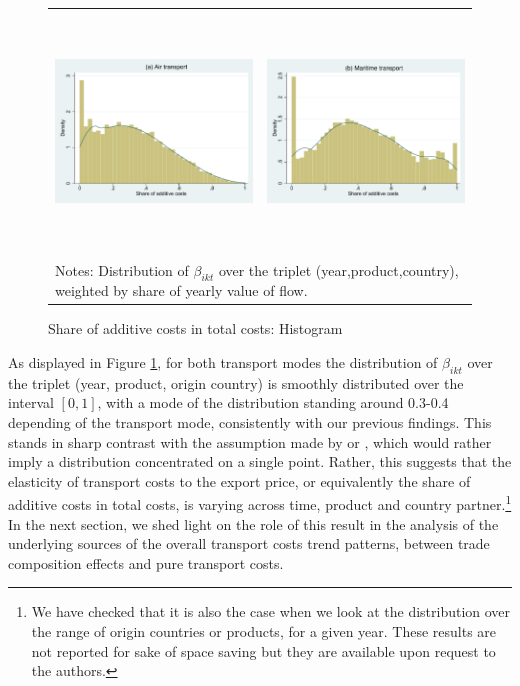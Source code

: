\documentclass[a4paper,11pt]{article}
\begin{document}
\begin{figure}[htbp]
\caption{Share of additive costs in total costs: Histogram}
\label{fig:histogram_beta}
\begin{center}
\begin{tabular}{cc}
\includegraphics[width=3.0in, height=2.5in]{Etude_beta_pondere_air.pdf}
& \includegraphics[width=3.0in,height=2.5in]{Etude_beta_pondere_ves.pdf} \\
\multicolumn{2}{l}{{\footnotesize Notes: Distribution of $\beta_{ikt}$ over the triplet (year,product,country), weighted by share of yearly value of flow.}}\\
\end{tabular}
\end{center}
\end{figure}

As displayed in Figure \ref{fig:histogram_beta}, for both transport modes the distribution of $\beta_{ikt}$ over the triplet (year, product, origin country) is smoothly distributed over the interval $[0,1]$, with a mode of the distribution standing around 0.3-0.4 depending of the transport mode, consistently with our previous findings.
This stands in sharp contrast with the assumption made by  \cite{hummels_skiba} or \cite{hummels2007}, which would rather imply a distribution concentrated on a single point.
Rather, this suggests that the elasticity of transport costs to the export price, or equivalently the share of additive costs in total costs, is varying across time, product and country partner.\footnote{We have checked that it is also the case when we look at the distribution over the range of origin countries or products, for a given year.
These results are not reported for sake of space saving but they are available upon request to the authors.} In the next section, we shed light on the role of this result in the analysis of the underlying sources of the overall transport costs trend patterns, between trade composition effects and pure transport costs.
\end{document}
